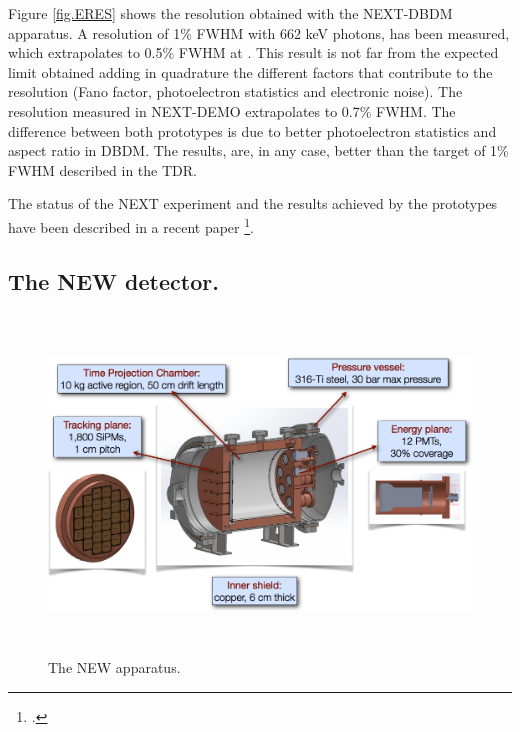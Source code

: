 Figure \ref{fig.ERES} shows the resolution obtained with the NEXT-DBDM apparatus. A resolution of 1\% FWHM with 
662 keV photons, has been measured, which extrapolates to 0.5\% FWHM at \Qbb. This result is not far from the expected limit obtained adding in quadrature the different factors that contribute to the resolution (Fano factor, photoelectron statistics and electronic noise). The resolution measured in NEXT-DEMO extrapolates to 0.7\% FWHM. The difference between both prototypes is due to better photoelectron statistics and aspect ratio in DBDM. The results, are, in any case, better than the target of 1\% FWHM described in the TDR.

The status of the NEXT experiment and the results achieved by the prototypes have been described in a recent
paper \footcite{Gomez-Cadenas:2013lta}.


\subsection{\label{sec.new}The NEW detector.}

\begin{figure}
\centering
\includegraphics[height=9cm]{img/NEW.png}
\caption{\small The NEW apparatus.} \label{fig:NEW}
\end{figure} 

